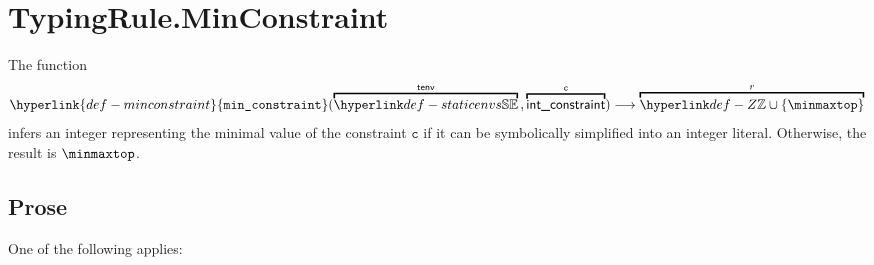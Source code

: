 \documentclass{book}
\newcommand\minconstraint[0]{\hyperlink{def-minconstraint}{\texttt{min\_constraint}}}
\newcommand\vc[0]{\texttt{c}}
\begin{document}
\section{TypingRule.MinConstraint \label{sec:TypingRule.MinConstraint}}
\hypertarget{def-minconstraint}{}
The function
\[
  \minconstraint(\overname{\staticenvs}{\tenv} \aslsep \overname{\intconstraint}{\vc}) \aslto \overname{\Z \cup \{\minmaxtop\}}{r}\\
\]
infers an integer representing the minimal value of the constraint $\vc$ if it can be symbolically
simplified into an integer literal. Otherwise, the result is $\minmaxtop$.

\subsection{Prose}
One of the following applies:
\end{document}

